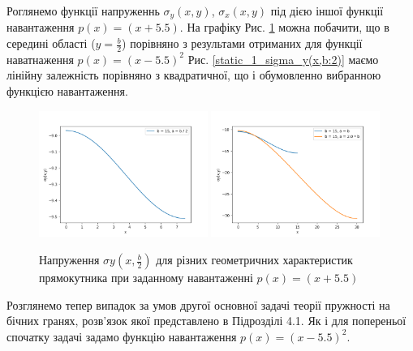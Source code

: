 Роглянемо функції напруженнь $\sigma_y(x,y)$, $\sigma_x(x,y)$ під дією іншої функції навантаження $p(x) = (x + 5.5)$.
На графіку Рис. \ref{static_1_sigma_y(x,b:2)2} можна побачити, що в середині області ($y=\frac{b}{2}$) порівняно з результами отриманих для функції наватнаження $p(x) = (x - 5.5)^2$ Рис. \ref{static_1_sigma_y(x,b:2)}
маємо лінійну залежність порівняно з квадратичної, що і обумовленно вибранною функцією навантаження.

\begin{figure}[H]
    \begin{center}
        \includegraphics[width=0.49\textwidth, scale=1]{images/results/static_1/sigma_y(x,b:2)3.png}
        \includegraphics[width=0.49\textwidth, scale=1]{images/results/static_1/sigma_y(x,b:2)4.png}
        \caption{Напруження $\sigma{y}(x, \frac{b}{2})$ для різних геометричних характеристик прямокутника при заданному навантаженні $p(x) = (x + 5.5)$}\label{static_1_sigma_y(x,b:2)2}
    \end{center}
\end{figure}


Розглянемо тепер випадок за умов другої основної задачі теорії пружності на бічних гранях,
розв'язок якої представлено в Підрозділі 4.1. Як і для попереньої спочатку задачі задамо функцію навантаження $p(x) = (x - 5.5)^2$.






